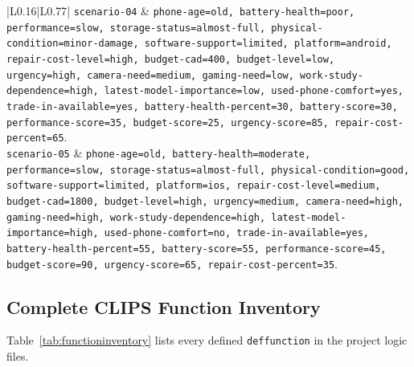 \documentclass[11pt]{article}
\begin{document}
\begin{longtable}{|L{0.16\textwidth}|L{0.77\textwidth}|}
\texttt{scenario-04} & \texttt{phone-age=old, battery-health=poor, performance=slow, storage-status=almost-full, physical-condition=minor-damage, software-support=limited, platform=android, repair-cost-level=high, budget-cad=400, budget-level=low, urgency=high, camera-need=medium, gaming-need=low, work-study-dependence=high, latest-model-importance=low, used-phone-comfort=yes, trade-in-available=yes, battery-health-percent=30, battery-score=30, performance-score=35, budget-score=25, urgency-score=85, repair-cost-percent=65}. \\ \hline
\texttt{scenario-05} & \texttt{phone-age=old, battery-health=moderate, performance=slow, storage-status=almost-full, physical-condition=good, software-support=limited, platform=ios, repair-cost-level=medium, budget-cad=1800, budget-level=high, urgency=medium, camera-need=high, gaming-need=high, work-study-dependence=high, latest-model-importance=high, used-phone-comfort=no, trade-in-available=yes, battery-health-percent=55, battery-score=55, performance-score=45, budget-score=90, urgency-score=65, repair-cost-percent=35}. \\ \hline
\hline
\end{longtable}

\subsection{Complete CLIPS Function Inventory}
Table~\ref{tab:functioninventory} lists every defined \texttt{deffunction} in the project logic files.
\end{document}
